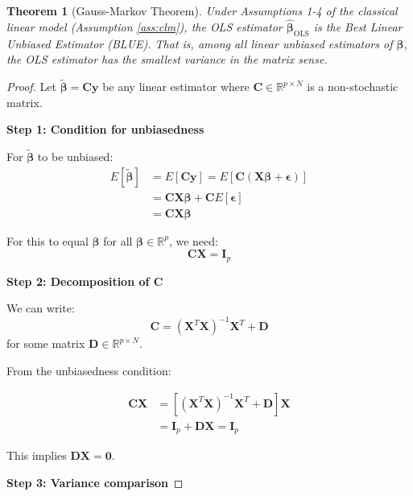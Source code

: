 \documentclass{article}
\newtheorem{theorem}{Theorem}
\begin{document}
\begin{theorem}[Gauss-Markov Theorem]
Under Assumptions 1-4 of the classical linear model (Assumption \ref{ass:clm}), the OLS estimator $\hat{\boldsymbol{\beta}}_{\text{OLS}}$ is the Best Linear Unbiased Estimator (BLUE). That is, among all linear unbiased estimators of $\boldsymbol{\beta}$, the OLS estimator has the smallest variance in the matrix sense.
\end{theorem}

\begin{proof}
Let $\tilde{\boldsymbol{\beta}} = \mathbf{C}\mathbf{y}$ be any linear estimator where $\mathbf{C} \in \mathbb{R}^{p \times N}$ is a non-stochastic matrix.

\textbf{Step 1: Condition for unbiasedness}

For $\tilde{\boldsymbol{\beta}}$ to be unbiased:
\begin{align}
E[\tilde{\boldsymbol{\beta}}] &= E[\mathbf{C}\mathbf{y}] = E[\mathbf{C}(\mathbf{X}\boldsymbol{\beta} + \boldsymbol{\epsilon})] \\
&= \mathbf{C}\mathbf{X}\boldsymbol{\beta} + \mathbf{C}E[\boldsymbol{\epsilon}] \\
&= \mathbf{C}\mathbf{X}\boldsymbol{\beta}
\end{align}

For this to equal $\boldsymbol{\beta}$ for all $\boldsymbol{\beta} \in \mathbb{R}^p$, we need:
\begin{equation}
\mathbf{C}\mathbf{X} = \mathbf{I}_p
\end{equation}

\textbf{Step 2: Decomposition of $\mathbf{C}$}

We can write:
\begin{equation}
\mathbf{C} = (\mathbf{X}^T\mathbf{X})^{-1}\mathbf{X}^T + \mathbf{D}
\end{equation}
for some matrix $\mathbf{D} \in \mathbb{R}^{p \times N}$.

From the unbiasedness condition:

\begin{align}
\mathbf{C}\mathbf{X} &= [(\mathbf{X}^T\mathbf{X})^{-1}\mathbf{X}^T + \mathbf{D}]\mathbf{X} \\
&= \mathbf{I}_p + \mathbf{D}\mathbf{X} = \mathbf{I}_p
\end{align}

This implies $\mathbf{D}\mathbf{X} = \mathbf{0}$.

\textbf{Step 3: Variance comparison}


\end{proof}
\end{document}
